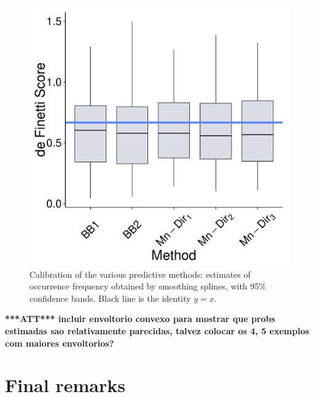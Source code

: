 \documentclass[journal,article,accept,moreauthors,pdftex,12pt,a4paper]{mdpi}
\newcommand{\red}[1]{\textbf{\color{red} ***ATT*** #1}}
\begin{document}
\begin{figure}[H]
\includegraphics[page=9,scale=0.3]{futebolComparacaoModelosForPaper.pdf}
  \caption{Calibration of the various predictive methods: estimates of occurrence frequency obtained by smoothing splines, with 95\% confidence bands. Black line is the identity $y=x$.}
  \label{fig::calibration}
\end{figure}


\red{incluir envoltorio convexo para mostrar que probs estimadas sao relativamente parecidas, talvez colocar os 4, 5 exemplos com maiores envoltorios?}


\section{Final remarks}
\label{sec::remarks}



\end{document}
